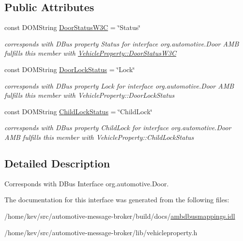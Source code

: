 \subsection*{Public Attributes}
\begin{DoxyCompactItemize}
\item 
\hypertarget{interfaceDoor_a4af5af6f4efc20234ce3f257bc5a3347}{const D\+O\+M\+String \hyperlink{interfaceDoor_a4af5af6f4efc20234ce3f257bc5a3347}{Door\+Status\+W3\+C} = \char`\"{}Status\char`\"{}}\label{interfaceDoor_a4af5af6f4efc20234ce3f257bc5a3347}

\begin{DoxyCompactList}\small\item\em corresponds with D\+Bus property Status for interface org.\+automotive.\+Door A\+M\+B fulfills this member with \hyperlink{classVehicleProperty_a43535323827c54d73fe8e7b68f131f79}{Vehicle\+Property\+::\+Door\+Status\+W3\+C} \end{DoxyCompactList}\item 
\hypertarget{interfaceDoor_ae84bb265834617dc8dd0d46c98b7974a}{const D\+O\+M\+String \hyperlink{interfaceDoor_ae84bb265834617dc8dd0d46c98b7974a}{Door\+Lock\+Status} = \char`\"{}Lock\char`\"{}}\label{interfaceDoor_ae84bb265834617dc8dd0d46c98b7974a}

\begin{DoxyCompactList}\small\item\em corresponds with D\+Bus property Lock for interface org.\+automotive.\+Door A\+M\+B fulfills this member with Vehicle\+Property\+::\+Door\+Lock\+Status \end{DoxyCompactList}\item 
\hypertarget{interfaceDoor_aef0d00bd271c3643df33b347ab163b1e}{const D\+O\+M\+String \hyperlink{interfaceDoor_aef0d00bd271c3643df33b347ab163b1e}{Child\+Lock\+Status} = \char`\"{}Child\+Lock\char`\"{}}\label{interfaceDoor_aef0d00bd271c3643df33b347ab163b1e}

\begin{DoxyCompactList}\small\item\em corresponds with D\+Bus property Child\+Lock for interface org.\+automotive.\+Door A\+M\+B fulfills this member with Vehicle\+Property\+::\+Child\+Lock\+Status \end{DoxyCompactList}\end{DoxyCompactItemize}


\subsection{Detailed Description}
Corresponds with D\+Bus Interface org.\+automotive.\+Door. 

The documentation for this interface was generated from the following files\+:\begin{DoxyCompactItemize}
\item 
/home/kev/src/automotive-\/message-\/broker/build/docs/\hyperlink{ambdbusmappings_8idl}{ambdbusmappings.\+idl}\item 
/home/kev/src/automotive-\/message-\/broker/lib/vehicleproperty.\+h\end{DoxyCompactItemize}
